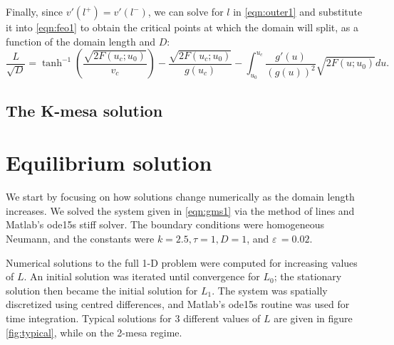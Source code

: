 \documentclass[a4paper,10pt]{article}
\newcommand{\Ep}{\ensuremath{\varepsilon\,}}
\begin{document}
Finally, since $v'(l^+)=v'(l^-)$, we can solve for $l$ in \eqref{eqn:outer1} and substitute it into \eqref{eqn:feo1} to obtain the critical points at which the domain will split, as a function of the domain length and $D$:
% 
\begin{equation}
  \label{eqn:final1}
  \frac{L}{\sqrt{D}}=\tanh^{-1}\left(\frac{\sqrt{2F(u_c;u_0)}}{v_c} \right) - \frac{\sqrt{2F(u_c;u_0)}}{g(u_c)} - \int_{u_0}^{u_c}\frac{g'(u)}{(g(u))^2}\sqrt{2F(u;u_0)}du.
\end{equation}
% 

\subsection{The K-mesa solution}

\section{Equilibrium solution}

We start by focusing on how solutions change numerically as the domain length increases. We solved the system given in \eqref{eqn:gms1} via the method of lines and Matlab's ode15s stiff solver. The boundary conditions were homogeneous Neumann, and the constants were $k=2.5, \tau=1, D=1$, and $\Ep=0.02$. 

Numerical solutions to the full 1-D problem were computed for increasing values of $L$. An initial solution was iterated until convergence for $L_0$; the stationary solution then became the initial solution for $L_1$. The system was spatially discretized using centred differences, and Matlab's ode15s routine was used for time integration. Typical solutions for 3 different values of $L$ are given in figure \ref{fig:typical}, while on the 2-mesa regime. 
\end{document}
